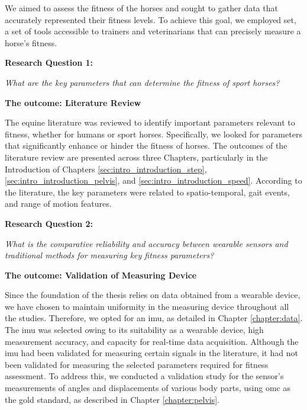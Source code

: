 We aimed to assess the fitness of the horses and sought to gather data that accurately represented their fitness levels. To achieve this goal, we employed \gls{set}, a set of tools accessible to trainers and veterinarians that can precisely measure a horse's fitness.

\vspace{0.3cm}

\noindent\textbf{\large Research Question 1:}

\textit{What are the key parameters that can determine the fitness of sport horses?}

\vspace{0.15cm}

\noindent\textbf{The outcome: Literature Review}

The equine literature was reviewed to identify important parameters relevant to fitness, whether for humans or sport horses. Specifically, we looked for parameters that significantly enhance or hinder the fitness of horses. The outcomes of the literature review are presented across three Chapters, particularly in the Introduction of Chapters \ref{sec:intro_introduction_step}, \ref{sec:intro_introduction_pelvis}, and \ref{sec:intro_introduction_speed}. According to the literature, the key parameters were related to spatio-temporal, gait events, and range of motion features.

\vspace{0.3cm}

\noindent\textbf{\large Research Question 2:}

\textit{What is the comparative reliability and accuracy between wearable sensors and traditional methods for measuring key fitness parameters?}

\vspace{0.15cm}

\noindent\textbf{The outcome: Validation of Measuring Device}

Since the foundation of the thesis relies on data obtained from a wearable device, we have chosen to maintain uniformity in the measuring device throughout all the studies. Therefore, we opted for an \gls{imu}, as detailed in Chapter \ref{chapter:data}. The \gls{imu} was selected owing to its suitability as a wearable device, high measurement accuracy, and capacity for real-time data acquisition. Although the \gls{imu} had been validated for measuring certain signals in the literature, it had not been validated for measuring the selected parameters required for fitness assessment. To address this, we conducted a validation study for the sensor's measurements of angles and displacements of various body parts, using \gls{omc} as the gold standard, as described in Chapter \ref{chapter:pelvis}. 

